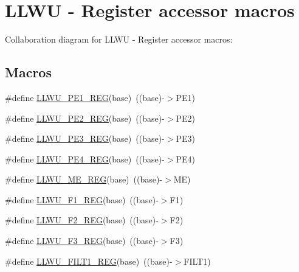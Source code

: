 \hypertarget{group___l_l_w_u___register___accessor___macros}{}\section{L\+L\+WU -\/ Register accessor macros}
\label{group___l_l_w_u___register___accessor___macros}
Collaboration diagram for L\+L\+WU -\/ Register accessor macros\+:
\subsection*{Macros}
\begin{DoxyCompactItemize}
\item 
\#define \hyperlink{group___l_l_w_u___register___accessor___macros_gac122d2548e2c00069618b75fc2dda5da}{L\+L\+W\+U\+\_\+\+P\+E1\+\_\+\+R\+EG}(base)~((base)-\/$>$P\+E1)
\item 
\#define \hyperlink{group___l_l_w_u___register___accessor___macros_ga5202d127ca8b88f5920c93ebbb9b9144}{L\+L\+W\+U\+\_\+\+P\+E2\+\_\+\+R\+EG}(base)~((base)-\/$>$P\+E2)
\item 
\#define \hyperlink{group___l_l_w_u___register___accessor___macros_ga31faa7fe2240e17d24eef3748a994673}{L\+L\+W\+U\+\_\+\+P\+E3\+\_\+\+R\+EG}(base)~((base)-\/$>$P\+E3)
\item 
\#define \hyperlink{group___l_l_w_u___register___accessor___macros_gabae264ac23ea3d486f55e8934a91df70}{L\+L\+W\+U\+\_\+\+P\+E4\+\_\+\+R\+EG}(base)~((base)-\/$>$P\+E4)
\item 
\#define \hyperlink{group___l_l_w_u___register___accessor___macros_ga5e41f250b27a820d46d083915e94f18f}{L\+L\+W\+U\+\_\+\+M\+E\+\_\+\+R\+EG}(base)~((base)-\/$>$ME)
\item 
\#define \hyperlink{group___l_l_w_u___register___accessor___macros_ga5f542b8bcaf97360c66a00993f229242}{L\+L\+W\+U\+\_\+\+F1\+\_\+\+R\+EG}(base)~((base)-\/$>$F1)
\item 
\#define \hyperlink{group___l_l_w_u___register___accessor___macros_gae1358cf4b6e51d98bc34424d263874ec}{L\+L\+W\+U\+\_\+\+F2\+\_\+\+R\+EG}(base)~((base)-\/$>$F2)
\item 
\#define \hyperlink{group___l_l_w_u___register___accessor___macros_ga302b69ef5f54896934af78a6e536a246}{L\+L\+W\+U\+\_\+\+F3\+\_\+\+R\+EG}(base)~((base)-\/$>$F3)
\item 
\#define \hyperlink{group___l_l_w_u___register___accessor___macros_ga9c1748a1618bcfc691f573c87202c4d3}{L\+L\+W\+U\+\_\+\+F\+I\+L\+T1\+\_\+\+R\+EG}(base)~((base)-\/$>$F\+I\+L\+T1)

\end{DoxyCompactItemize}
